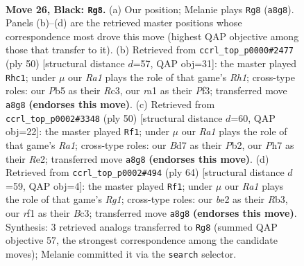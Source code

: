 \documentclass[11pt]{article}
\begin{document}
\clearpage

\begin{figure}[p]\centering
\begin{subfigure}{0.46\textwidth}\centering
\resizebox{\linewidth}{!}{%
\newchessgame
\chessboard[
  setfen={r6k/p1bb2pp/P4n2/1p3p2/1n3P2/1P2P1P1/4B3/RNB2RK1 b - - 1 26},
  showmover=false,
  pgfstyle=straightmove, color=movearrow, markmove={a8-g8}
]}
\caption{}
\end{subfigure}\hfill
\begin{subfigure}{0.46\textwidth}\centering
\resizebox{\linewidth}{!}{%
\newchessgame
\chessboard[
  setfen={2rr2k1/3n1pp1/p2b3p/1p2p2P/3P4/2RNBP2/PP4P1/1K5R w - - 0 26},
  showmover=false,
  pgfstyle=straightmove, color=movearrow, markmove={h1-c1}
]}
\caption{}
\end{subfigure}
\\[4pt]
\begin{subfigure}{0.46\textwidth}\centering
\resizebox{\linewidth}{!}{%
\newchessgame
\chessboard[
  setfen={2krn3/pp2b2r/2p1pp2/6p1/2NPP3/2B3PP/PP2R1K1/R7 w - - 0 26},
  showmover=false,
  pgfstyle=straightmove, color=movearrow, markmove={a1-f1}
]}
\caption{}
\end{subfigure}\hfill
\begin{subfigure}{0.46\textwidth}\centering
\resizebox{\linewidth}{!}{%
\newchessgame
\chessboard[
  setfen={3r1bk1/5p2/pp5r/2p3p1/PnN3P1/1RB1P2p/1P2KP1P/6R1 w - - 1 33},
  showmover=false,
  pgfstyle=straightmove, color=movearrow, markmove={g1-f1}
]}
\caption{}
\end{subfigure}
\caption{\textbf{Move 26, Black: \texttt{Rg8}.} (a) Our position; Melanie plays \texttt{Rg8} (\texttt{a8g8}). Panels (b)--(d) are the retrieved master positions whose correspondence most drove this move (highest QAP objective among those that transfer to it). (b) Retrieved from \texttt{ccrl\_top\_p0000\#2477} (ply 50) [structural distance $d$=57, QAP obj=31]: the master played \texttt{Rhc1}; under $\mu$ our \emph{Ra1} plays the role of that game's \emph{Rh1}; cross-type roles: our \emph{P}b5 as their \emph{R}c3, our \emph{r}a1 as their \emph{P}f3; transferred move \texttt{a8g8} \textbf{(endorses this move)}. (c) Retrieved from \texttt{ccrl\_top\_p0002\#3348} (ply 50) [structural distance $d$=60, QAP obj=22]: the master played \texttt{Rf1}; under $\mu$ our \emph{Ra1} plays the role of that game's \emph{Ra1}; cross-type roles: our \emph{B}d7 as their \emph{P}b2, our \emph{P}h7 as their \emph{R}e2; transferred move \texttt{a8g8} \textbf{(endorses this move)}. (d) Retrieved from \texttt{ccrl\_top\_p0002\#494} (ply 64) [structural distance $d$=59, QAP obj=4]: the master played \texttt{Rf1}; under $\mu$ our \emph{Ra1} plays the role of that game's \emph{Rg1}; cross-type roles: our \emph{b}e2 as their \emph{R}b3, our \emph{r}f1 as their \emph{B}c3; transferred move \texttt{a8g8} \textbf{(endorses this move)}. Synthesis: 3 retrieved analogs transferred to \texttt{Rg8} (summed QAP objective 57, the strongest correspondence among the candidate moves); Melanie committed it via the \texttt{search} selector.}
\label{fig:thought-m51}
\end{figure}
\end{document}
